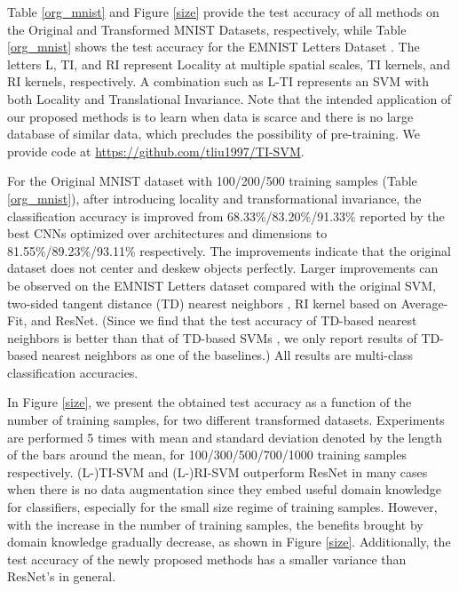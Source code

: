 \documentclass{article}
\theoremstyle{plain}
\theoremstyle{definition}
\theoremstyle{remark}
\begin{document}
Table \ref{org_mnist} and Figure \ref{size} provide the test accuracy of all methods on the Original and Transformed MNIST Datasets, respectively, while Table \ref{org_mnist} shows the test accuracy for the EMNIST Letters Dataset \cite{cohen2017emnist}. The letters L, TI, and RI represent Locality at multiple spatial scales, TI kernels, and RI kernels, respectively. A combination such as L-TI represents an SVM with both Locality and Translational Invariance. Note that the intended application of our proposed methods is to learn when data is scarce and there is no large database of similar data, which precludes the possibility of pre-training. We provide code at \href{https://github.com/tliu1997/TI-SVM}{https://github.com/tliu1997/TI-SVM}.

For the Original MNIST dataset with 100/200/500 training samples (Table \ref{org_mnist}), after introducing locality and transformational invariance, the classification accuracy is improved from 68.33\%/83.20\%/91.33\% reported by the best CNNs optimized over architectures and dimensions \cite{d2020structural} to 81.55\%/89.23\%/93.11\% respectively. The improvements indicate that the original dataset does not center and deskew objects perfectly. Larger improvements can be observed on the EMNIST Letters dataset \cite{cohen2017emnist} compared with the original SVM, two-sided tangent distance (TD) nearest neighbors \cite{simard1998transformation}, RI kernel based on Average-Fit, and ResNet.
(Since we find that the test accuracy of TD-based nearest neighbors \cite{simard1998transformation} is better than that of TD-based SVMs \cite{haasdonk2002tangent}, we only report results of TD-based nearest neighbors as one of the baselines.) All results are multi-class classification accuracies. 

In Figure \ref{size}, we present the obtained test accuracy as a function of the number of training samples, for two different transformed datasets. Experiments are performed 5 times with mean and standard deviation denoted by the length of the bars around the mean, for 100/300/500/700/1000 training samples respectively. (L-)TI-SVM and (L-)RI-SVM outperform ResNet in many cases when there is no data augmentation since they embed useful domain knowledge for classifiers, especially for the small size regime of training samples. However, with the increase in the number of training samples, the benefits brought by domain knowledge gradually decrease, as shown in Figure \ref{size}. Additionally, the test accuracy of the newly proposed methods has a smaller variance than ResNet's in general.
\end{document}
